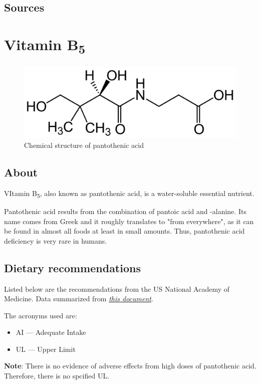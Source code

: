 \documentclass{book}
\begin{document}
\begin{sloppypar}
\section{Sources}


\chapter{Vitamin B\texorpdfstring{\textsubscript{5}}{5}}
\begin{figure}[h]
	\caption{Chemical structure of pantothenic acid}
	\centering \includegraphics[width=\textwidth]{images/Vitamin_B5_chemical_structure}
\end{figure}
\newpage

\section{About}
VItamin B\textsubscript{5}, also known as pantothenic acid, is a water-soluble essential nutrient.

Pantothenic acid results from the combination of pantoic acid and \textbeta-alanine.
Its name comes from Greek and it roughly translates to "from everywhere", as it can be found in almost all foods at least in small amounts.
Thus, pantothenic acid deficiency is very rare in humans.

\section{Dietary recommendations}
Listed below are the recommendations from the US National Academy of Medicine. Data summarized from \href{https://nap.nationalacademies.org/read/6015/chapter/12}{\textit{this document}}.

The acronyms used are:
\begin{itemize}
	\item AI --- Adequate Intake
	\item UL --- Upper Limit
\end{itemize}

\textbf{Note}: There is no evidence of adverse effects from high doses of pantothenic acid. Therefore, there is no spcified UL.


\end{sloppypar}
\end{document}
